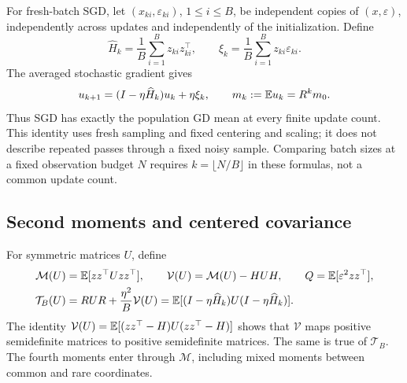 For fresh-batch SGD, let $(x_{ki},\varepsilon_{ki})$, $1 \le i \le B$, be
independent copies of $(x,\varepsilon)$, independently across updates and
independently of the initialization. Define
\[
 \widehat H_k = \frac1B\sum_{i=1}^B z_{ki}z_{ki}^\top,\qquad \xi_k
              = \frac1B\sum_{i=1}^B z_{ki}\varepsilon_{ki}.
\]
The averaged stochastic gradient gives
\begin{equation}
 \label{eq:discrete-sgd-update}
 u_{k+1} = (I - \eta\widehat H_k)u_k + \eta\xi_k, \qquad m_k := \mathbb{E} u_k = R^km_0.
\end{equation}
Thus SGD has exactly the population GD mean at every finite update count. This
identity uses fresh sampling and fixed centering and scaling; it does not
describe repeated passes through a fixed noisy sample. Comparing batch sizes at
a fixed observation budget $N$ requires $k = \lfloor N/B\rfloor$ in these
formulas, not a common update count.

\subsection{Second moments and centered covariance}

For symmetric matrices $U$, define
\begin{align}
 \mathcal M(U)   & = \mathbb{E}[zz^\top Uzz^\top],\qquad \mathcal V(U) = \mathcal M(U) - HUH, \qquad Q = \mathbb{E}[\varepsilon^2zz^\top],\label{eq:discrete-operators} \\
 \mathcal T_B(U) & = RUR + \frac{\eta^2}{B}\mathcal V(U) = \mathbb{E}[(I-\eta\widehat H_k)U(I-\eta\widehat H_k)].\label{eq:discrete-T}
\end{align}
The identity $\mathcal V(U) = \mathbb{E}[(zz^\top-H)U(zz^\top-H)]$ shows that
$\mathcal V$ maps positive semidefinite matrices to positive semidefinite
matrices. The same is true of $\mathcal T_B$. The fourth moments enter through
$\mathcal M$, including mixed moments between common and rare coordinates.

